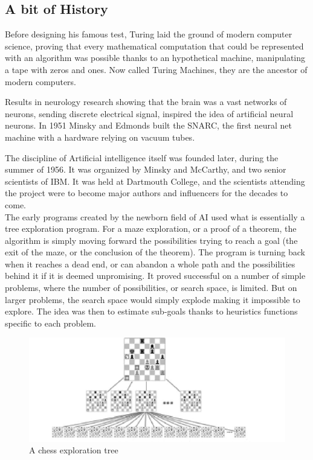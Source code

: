 \documentclass[12pt]{article}
\begin{document}
\subsection{A bit of History}

\smallskip

Before designing his famous test, Turing laid the ground of modern computer
science, proving that every mathematical computation that could be represented
with an algorithm was possible thanks to an hypothetical machine, manipulating
a tape with zeros and ones. Now called Turing Machines, they are the ancestor
of modern computers.\cite{Turing1936}

Results in neurology research showing that the brain was a vast networks of
neurons, sending discrete electrical signal, inspired the idea of artificial
neural neurons. In 1951 Minsky and Edmonds built the SNARC, the first neural net
machine with a hardware relying on vacuum tubes.

The discipline of Artificial intelligence itself was founded later, during the
summer of 1956. It was organized by Minsky and McCarthy, and two senior
scientists of IBM. It was held at Dartmouth College, and the scientists
attending the project were to become major authors and influencers for the
decades to come. \cite{DartMouth}\\

The early programs created by the newborn field of AI used what is essentially a
tree exploration program. For a maze exploration, or a proof of a theorem, the
algorithm is simply moving forward the possibilities trying to reach a goal (the
exit of the maze, or the conclusion of the theorem). The program is turning
back when it reaches a dead end, or can abandon a whole path and the
possibilities behind it if it is deemed unpromising. It proved successful on a
number of simple problems, where the number of possibilities, or search space,
is limited. But on larger problems, the search space would simply explode making
it impossible to explore. The idea was then to estimate sub-goals thanks to
heuristics functions specific to each problem.

\begin{figure}[ht]
    \centering
    \includegraphics[width=\textwidth]{chess-tree}
    \caption{A chess exploration tree}
    \label{fig:chess_tree}
\end{figure}
\end{document}
